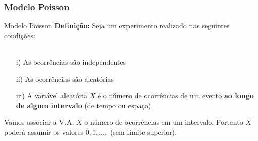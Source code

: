 \documentclass[10pt]{beamer}\usepackage[]{graphicx}\usepackage[]{color}
\theoremstyle{definition}
\begin{document}



\subsubsection{Modelo Poisson}

\begin{frame}[fragile]{Modelo Poisson}
  \textbf{Definição:} Seja um experimento realizado nas seguintes
  condições: \\~\\
  \begin{itemize}
  \item[i)] As ocorrências são independentes
  \item[ii)] As ocorrências são aleatórias
  \item[iii)] A variável aleatória $X$ é o número de ocorrências de um
    evento \textbf{ao longo de algum intervalo} (de tempo ou espaço)
  \end{itemize}
  \vspace{1em}
  Vamos associar a V.A. $X$ o número de ocorrências em um
  intervalo. Portanto $X$ poderá assumir os valores $0, 1, \ldots,$ (sem
  limite superior).
\end{frame}
\end{document}
